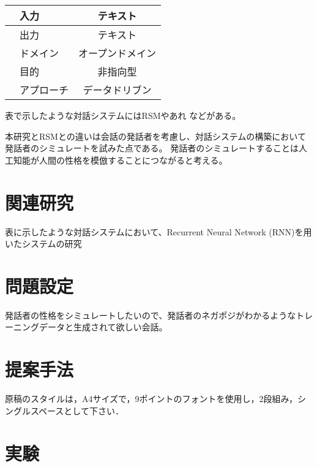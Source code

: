 \documentclass{deimj}
\begin{document}
\begin{table}[h]
  \centering
  \begin{tabular}{|l|c|} \hline
    　入力 & テキスト \\ \hline
    　出力 & テキスト \\ \hline
    　ドメイン & オープンドメイン \\ \hline
    　目的 & 非指向型 \\ \hline
    　アプローチ & データドリブン \\ \hline
  \end{tabular}
\end{table}

表で示したような対話システムにはRSMやあれ%
などがある。

本研究とRSMとの違いは会話の発話者を考慮し、対話システムの構築において発話者のシミュレートを試みた点である。
発話者のシミュレートすることは人工知能が人間の性格を模倣することにつながると考える。

\section{関連研究}
\label{sec:related}


表に示したような対話システムにおいて、Recurrent Neural Network (RNN)を用いたシステムの研究


\section{問題設定}
\label{sec:problem}

発話者の性格をシミュレートしたいので、発話者のネガポジがわかるようなトレーニングデータと生成されて欲しい会話。

\section{提案手法}
\label{sec:proposal}

原稿のスタイルは，A4サイズで，9ポイントのフォントを使用し，2段組み，シ
ングルスペースとして下さい．

\section{実験}
\label{sec:experiment}
\end{document}
